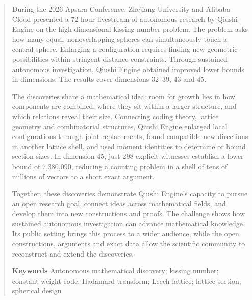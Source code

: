 \begin{abstract}
During the 2026 Apsara Conference, Zhejiang University and Alibaba Cloud
presented a 72-hour livestream of autonomous research by Qiushi Engine
on the high-dimensional kissing-number problem. The problem asks how many
equal, nonoverlapping spheres can simultaneously touch a central sphere.
Enlarging a configuration requires finding new geometric possibilities
within stringent distance constraints. Through sustained autonomous
investigation, Qiushi Engine obtained improved lower bounds in
\ResultCount{} dimensions.
The results cover dimensions 32--39, 43 and 45.

The discoveries share a mathematical idea: room for growth lies in how
components are combined, where they sit within a larger structure, and
which relations reveal their size. Connecting coding theory, lattice
geometry and combinatorial structures, Qiushi Engine enlarged local
configurations through joint replacements, found compatible new directions
in another lattice shell, and used moment identities to determine or bound
section sizes. In dimension 45, just 298 explicit witnesses establish a
lower bound of 7,380,090, reducing a counting problem in a shell of tens
of millions of vectors to a short exact argument.

Together, these discoveries demonstrate Qiushi Engine's capacity to pursue
an open research goal, connect ideas across mathematical fields, and
develop them into new constructions and proofs. The challenge shows how
sustained autonomous investigation can advance mathematical knowledge.
Its public setting brings this process to a wider audience, while the
open constructions, arguments and exact data allow the scientific
community to reconstruct and extend the discoveries.

\par\smallskip\noindent\textbf{Keywords}\quad
Autonomous mathematical discovery; kissing number; constant-weight code; Hadamard transform; Leech lattice;
lattice section; spherical design
\end{abstract}
